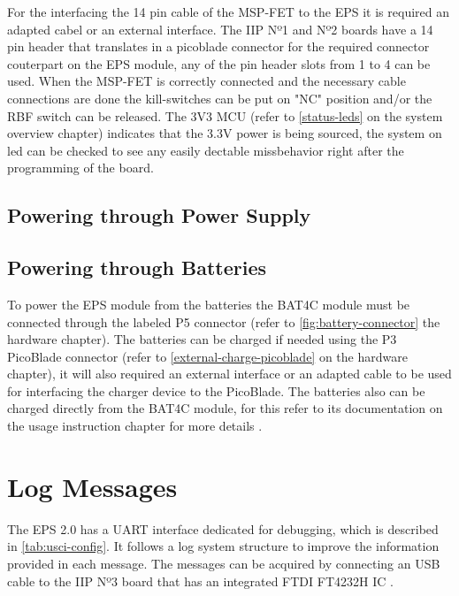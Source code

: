 For the interfacing the 14 pin cable of the MSP-FET to the EPS it is required an adapted cabel or an external interface. 
The IIP\cite{iip} Nº1 and Nº2 boards have a 14 pin header that translates in a picoblade connector for the required connector couterpart on the EPS module, any of the pin header slots from 1 to 4 can be used.
When the MSP-FET is correctly connected and the necessary cable connections are done the kill-switches can be put on "NC" position and/or the RBF switch can be released.
The 3V3 MCU (refer to \autoref{status-leds} on the system overview chapter) indicates that the 3.3V power is being sourced, the system on led can be checked to see any easily dectable missbehavior right after the programming of the board. 



\subsection{Powering through Power Supply}


\subsection{Powering through Batteries}

To power the EPS module from the batteries the BAT4C module must be connected through the labeled P5 connector (refer to \autoref{fig:battery-connector} the hardware chapter).
The batteries can be charged if needed using the P3 PicoBlade connector (refer to \autoref{external-charge-picoblade} on the hardware chapter), it will also required an external interface or an adapted cable to be used for interfacing the charger device to the PicoBlade.
The batteries also can be charged directly from the BAT4C module, for this refer to its documentation on the usage instruction chapter for more details \cite{bat4c}.


\section{Log Messages}

The EPS 2.0 has a UART interface dedicated for debugging, which is described in \autoref{tab:usci-config}. It follows a log system structure to improve the information provided in each message.
The messages can be acquired by connecting an USB cable to the IIP Nº3 board that has an integrated FTDI FT4232H IC \cite{iip}.
